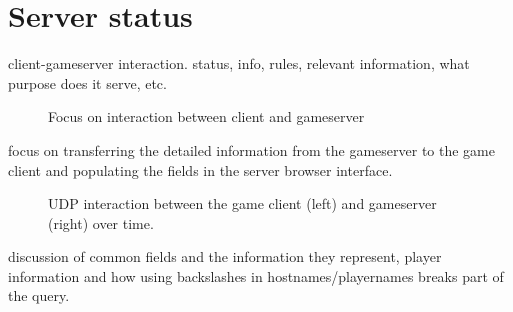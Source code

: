 \chapter{Server status}
\label{chap:status}

client-gameserver interaction. status, info, rules, relevant information, what purpose does it serve, etc\cite{oldunreal1}.

\begin{figure}[h]
\centering

\caption{Focus on interaction between client and gameserver}\label{fig:overviewcgs}
\end{figure}

focus on transferring the detailed information from the gameserver to the game client and populating the fields in the server browser interface.

\begin{figure}[H]
\centering

\caption{UDP interaction between the game client (left) and gameserver (right) over time.}
\label{fig:status}
\end{figure}

discussion of common fields and the information they represent, player information and how using backslashes in hostnames/playernames breaks part of the query.
